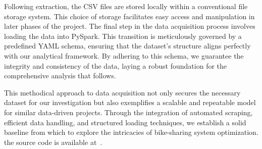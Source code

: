 \documentclass[12pt, a4paper]{article}
\begin{document}
    Following extraction, the CSV files are stored locally within a conventional file storage system.
    This choice of storage facilitates easy access and manipulation in later phases of the project.
    The final step in the data acquisition process involves loading the data into PySpark.
    This transition is meticulously governed by a predefined YAML schema, ensuring that the dataset's structure aligns perfectly with our analytical framework.
    By adhering to this schema, we guarantee the integrity and consistency of the data, laying a robust foundation for the comprehensive analysis that follows.

    This methodical approach to data acquisition not only secures the necessary dataset for our investigation but also exemplifies a scalable and repeatable model for similar data-driven projects.
    Through the integration of automated scraping, efficient data handling, and structured loading techniques, we establish a solid baseline from which to explore the intricacies of bike-sharing system optimization.
    the source code is available at~\cite{TechProjectSourceCode}.
\end{document}
